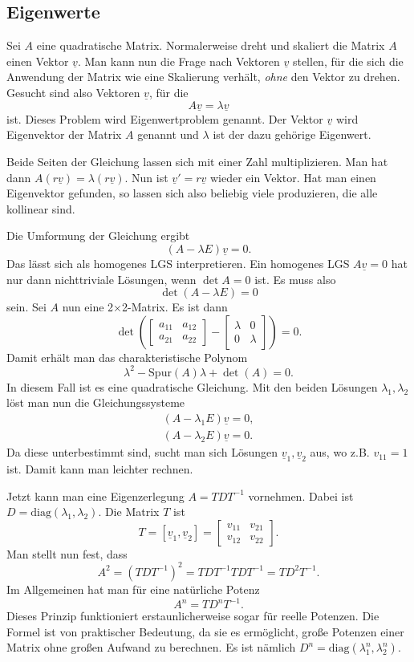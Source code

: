 \documentclass[a4paper,10pt,fleqn,twocolumn,twoside]{article}
\begin{document}
\subsection{Eigenwerte}

Sei \(A\) eine quadratische Matrix. Normalerweise dreht und skaliert
die Matrix \(A\) einen Vektor \(\underline v\). Man kann nun die Frage
nach Vektoren \(\underline v\) stellen, für die sich die Anwendung
der Matrix wie eine Skalierung verhält, \textit{ohne} den Vektor zu
drehen. Gesucht sind also Vektoren \(\underline v\), für die
\[A\underline v = \lambda\underline v\]
ist. Dieses Problem wird Eigenwertproblem genannt. Der Vektor
\(\underline v\) wird Eigenvektor der Matrix \(A\) genannt und
\(\lambda\) ist der dazu gehörige Eigenwert.

Beide Seiten der Gleichung lassen sich mit einer Zahl multiplizieren.
Man hat dann \(A(r\underline v)=\lambda(r\underline v)\).
Nun ist \(\underline v'=r\underline v\) wieder ein Vektor.
Hat man einen Eigenvektor gefunden, so lassen sich also beliebig
viele produzieren, die alle kollinear sind.

Die Umformung der Gleichung ergibt
\[(A-\lambda E)\underline v=0.\]
Das lässt sich als homogenes LGS interpretieren. Ein homogenes LGS
\(A\underline v=0\) hat nur dann nichttriviale Lösungen,
wenn \(\det A=0\) ist. Es muss also
\[\det(A-\lambda E)=0\]
sein. Sei \(A\) nun eine 2\(\times\)2-Matrix. Es ist dann
\[\det\left(\begin{bmatrix}a_{11} & a_{12}\\
a_{21} & a_{22}\end{bmatrix}-
\begin{bmatrix}\lambda & 0\\
0 & \lambda\end{bmatrix}\right)=0.\]
Damit erhält man das charakteristische Polynom
\[\lambda^2 -\mathrm{Spur}(A)\lambda+\det(A)=0.\]
In diesem Fall ist es eine quadratische Gleichung.
Mit den beiden Lösungen \(\lambda_1,\lambda_2\) löst man nun
die Gleichungssysteme
\begin{gather*}
(A-\lambda_1 E)\underline v=0,\\
(A-\lambda_2 E)\underline v=0.
\end{gather*}
Da diese unterbestimmt sind, sucht man sich Lösungen
\(\underline v_1,\underline v_2\) aus, wo z.B. \(v_{11}=1\) ist.
Damit kann man leichter rechnen.

Jetzt kann man eine Eigenzerlegung \(A=TDT^{-1}\) vornehmen.
Dabei ist \(D=\mathrm{diag}(\lambda_1,\lambda_2)\).
Die Matrix \(T\) ist
\[T=[\underline v_1, \underline v_2]=\begin{bmatrix}
v_{11} & v_{21}\\
v_{12} & v_{22}
\end{bmatrix}.\]
Man stellt nun fest, dass
\[A^2 = (TDT^{-1})^2 = TDT^{-1}TDT^{-1} = TD^2T^{-1}.\]
Im Allgemeinen hat man für eine natürliche Potenz
\[A^n = TD^nT^{-1}.\]
Dieses Prinzip funktioniert erstaunlicherweise sogar für reelle
Potenzen. Die Formel ist von praktischer Bedeutung, da sie es
ermöglicht, große Potenzen einer Matrix ohne großen Aufwand zu
berechnen. Es ist nämlich
\(D^n=\mathrm{diag}(\lambda_1^n,\lambda_2^n)\).
\end{document}
